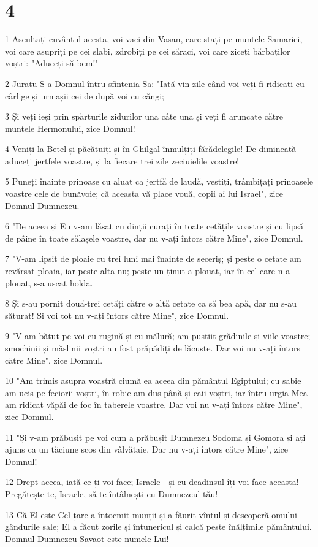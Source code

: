 \chapter{4}

\par 1 Ascultați cuvântul acesta, voi vaci din Vasan, care stați pe muntele Samariei, voi care asupriți pe cei slabi, zdrobiți pe cei săraci, voi care ziceți bărbaților voștri: "Aduceți să bem!"
\par 2 Juratu-S-a Domnul întru sfințenia Sa: "Iată vin zile când voi veți fi ridicați cu cârlige și urmașii cei de după voi cu căngi;
\par 3 Și veți ieși prin spărturile zidurilor una câte una și veți fi aruncate către muntele Hermonului, zice Domnul!
\par 4 Veniți la Betel și păcătuiți și în Ghilgal înmulțiți fărădelegile! De dimineață aduceți jertfele voastre, și la fiecare trei zile zeciuielile voastre!
\par 5 Puneți înainte prinoase cu aluat ca jertfă de laudă, vestiți, trâmbițați prinoasele voastre cele de bunăvoie; că aceasta vă place vouă, copii ai lui Israel", zice Domnul Dumnezeu.
\par 6 "De aceea și Eu v-am lăsat cu dinții curați în toate cetățile voastre și cu lipsă de pâine în toate sălașele voastre, dar nu v-ați întors către Mine", zice Domnul.
\par 7 "V-am lipsit de ploaie cu trei luni mai înainte de seceriș; și peste o cetate am revărsat ploaia, iar peste alta nu; peste un ținut a plouat, iar în cel care n-a plouat, s-a uscat holda.
\par 8 Și s-au pornit două-trei cetăți către o altă cetate ca să bea apă, dar nu s-au săturat! Si voi tot nu v-ați întors către Mine", zice Domnul.
\par 9 "V-am bătut pe voi cu rugină și cu mălură; am pustiit grădinile și viile voastre; smochinii și măslinii voștri au fost prăpădiți de lăcuste. Dar voi nu v-ați întors către Mine", zice Domnul.
\par 10 "Am trimis asupra voastră ciumă ea aceea din pământul Egiptului; cu sabie am ucis pe feciorii voștri, în robie am dus până și caii voștri, iar întru urgia Mea am ridicat văpăi de foc în taberele voastre. Dar voi nu v-ați întors către Mine", zice Domnul.
\par 11 "Și v-am prăbușit pe voi cum a prăbușit Dumnezeu Sodoma și Gomora și ați ajuns ca un tăciune scos din vâlvătaie. Dar nu v-ați întors către Mine", zice Domnul!
\par 12 Drept aceea, iată ce-ți voi face; Israele - și cu deadinsul îți voi face aceasta! Pregătește-te, Israele, să te întâlnești cu Dumnezeul tău!
\par 13 Că El este Cel țare a întocmit munții și a făurit vîntul și descoperă omului gândurile sale; El a făcut zorile și întunericul și calcă peste înălțimile pământului. Domnul Dumnezeu Savaot este numele Lui!


